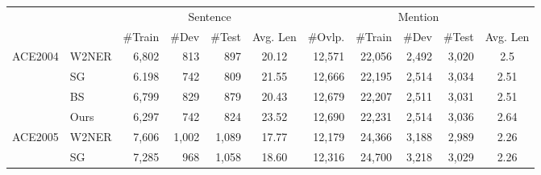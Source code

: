 \documentclass[11pt]{article}
\begin{document}
\begin{table*}[]
  \centering
  \small
  \setlength{\tabcolsep}{3pt}
  \begin{tabular}{clrrrcrrrrc}
  \toprule
  \multicolumn{1}{l}{}     &       & \multicolumn{4}{c}{Sentence}                                                                                        & \multicolumn{5}{c}{Mention}                                                                            \\ \cmidrule(r){3-6} \cmidrule(r){7-11}
  \multicolumn{1}{l}{}     &       & \multicolumn{1}{l}{\#Train} & \multicolumn{1}{l}{\#Dev} & \multicolumn{1}{l}{\#Test} & \multicolumn{1}{l}{Avg. Len} & \multicolumn{1}{l}{\#Ovlp.} & \multicolumn{1}{l}{\#Train} & \multicolumn{1}{l}{\#Dev} & \multicolumn{1}{l}{\#Test} & \multicolumn{1}{l}{Avg. Len}  \\ \midrule
  \multirow{4}{*}{ACE2004} & W2NER & 6,802 & 813 & 897 & 20.12 & 12,571 & 22,056 & 2,492 & 3,020 & 2.5                         \\
                           & SG    & 6.198                        & 742                       & 809                        & 21.55                        & 12,666                       & 22,195                       & 2,514                      & 3,034                       & 2.51                         \\
                           & BS    & 6,799                        & 829                       & 879                        & 20.43                        & 12,679                       & 22,207                       & 2,511                      & 3,031                       & 2.51                         \\
                           & Ours  & 6,297                        & 742                       & 824                        & 23.52                        & 12,690                       & 22,231                       & 2,514                      & 3,036                       & 2.64                         \\
                           \midrule
  \multirow{4}{*}{ACE2005} & W2NER & 7,606 & 1,002 & 1,089 & 17.77 & 12,179 & 24,366 & 3,188 & 2,989 & 2.26                        \\
                           & SG    & 7,285                        & 968                       & 1,058                       & 18.60                         & 12,316                       & 24,700                       & 3,218                      & 3,029                       & 2.26                         \\

\end{tabular}
\end{table*}
\end{document}
